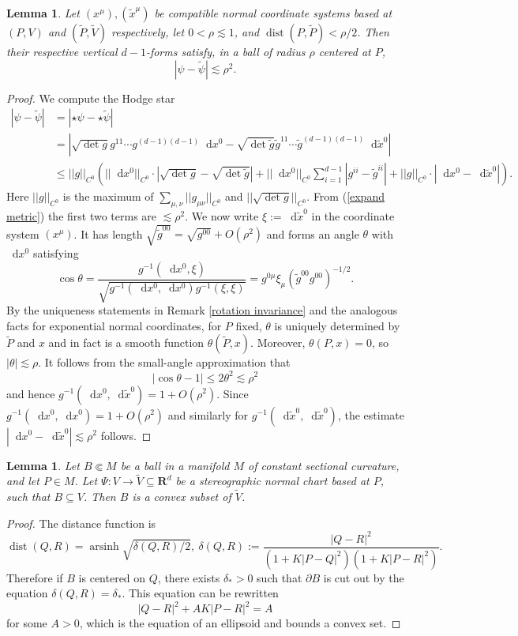 \documentclass[reqno,10pt]{amsart}
\newcommand{\RR}{\mathbf{R}}
\newcommand*\dif{\mathop{}\!\mathrm{d}}
\DeclareMathOperator{\dist}{dist}
\newtheorem{lemma}[theorem]{Lemma}
\theoremstyle{definition}
\numberwithin{equation}{section}
\begin{document}
\begin{lemma}\label{compatible verticals}
Let $(x^\mu), (\tilde x^\mu)$ be compatible normal coordinate systems based at $(P, V)$ and $(\tilde P, \tilde V)$ respectively, let $0 < \rho \lesssim 1$, and $\dist(P, \tilde P) < \rho/2$. Then their respective vertical $d-1$-forms satisfy, in a ball of radius $\rho$ centered at $P$,
$$|\psi - \tilde \psi| \lesssim \rho^2.$$
\end{lemma}
\begin{proof}
We compute the Hodge star 
\begin{align*}
|\psi - \tilde \psi| &= |\star \psi - \star \tilde \psi| \\
&= |\sqrt{\det g} g^{11} \cdots g^{(d-1)(d-1)} \dif x^0 - \sqrt{\det \tilde g} \tilde g^{11} \cdots \tilde g^{(d-1)(d-1)} \dif \tilde x^0| \\
&\leq ||g||_{C^0} (||\dif x^0||_{C^0} \cdot |\sqrt{\det g} - \sqrt{\det \tilde g}| + ||\dif x^0||_{C^0} \sum_{i=1}^{d - 1} |g^{ii} - \tilde g^{ii}| + ||g||_{C^0} \cdot |\dif x^0 - \dif \tilde x^0|).
\end{align*}
Here $||g||_{C^0}$ is the maximum of $\sum_{\mu, \nu} ||g_{\mu\nu}||_{C^0}$ and $||\sqrt{\det g}||_{C^0}$.
From (\ref{expand metric}) the first two terms are $\lesssim \rho^2$.
We now write $\xi := \dif \tilde x^0$ in the coordinate system $(x^\mu)$.
It has length $\sqrt{\tilde g^{00}} = \sqrt{g^{00}} + O(\rho^2)$ and forms an angle $\theta$ with $\dif x^0$ satisfying 
$$\cos \theta = \frac{g^{-1}(\dif x^0, \xi)}{\sqrt{g^{-1}(\dif x^0, \dif x^0) g^{-1}(\xi, \xi)}} = g^{0\mu} \xi_\mu (\tilde g^{00} g^{00})^{-1/2}.$$
By the uniqueness statements in Remark \ref{rotation invariance} and the analogous facts for exponential normal coordinates, for $P$ fixed, $\theta$ is uniquely determined by $\tilde P$ and $x$ and in fact is a smooth function $\theta(\tilde P, x)$.
Moreover, $\theta(P, x) = 0$, so $|\theta| \lesssim \rho$.
It follows from the small-angle approximation that
$$|\cos \theta - 1| \leq 2\theta^2 \lesssim \rho^2$$
and hence $g^{-1}(\dif x^0, \dif \tilde x^0) = 1 + O(\rho^2)$.
Since $g^{-1}(\dif x^0, \dif x^0) = 1 + O(\rho^2)$ and similarly for $g^{-1}(\dif \tilde x^0, \dif \tilde x^0)$, the estimate $|\dif x^0 - \dif \tilde x^0| \lesssim \rho^2$ follows.
\end{proof}

\begin{lemma}\label{convexity of balls}
Let $B \Subset M$ be a ball in a manifold $M$ of constant sectional curvature, and let $P \in M$.
Let $\Psi: V \to \tilde V \subseteq \RR^d$ be a stereographic normal chart based at $P$, such that $B \subseteq V$.
Then $B$ is a convex subset of $\tilde V$.
\end{lemma}
\begin{proof}
The distance function is
$$\dist(Q, R) = \operatorname{arsinh} \sqrt{\delta(Q, R)/2}, ~\delta(Q, R) := \frac{|Q - R|^2}{(1 + K|P - Q|^2)(1 + K|P - R|^2)}.$$
Therefore if $B$ is centered on $Q$, there exists $\delta_* > 0$ such that $\partial B$ is cut out by the equation $\delta(Q, R) = \delta_*$.
This equation can be rewritten
$$|Q - R|^2 + AK|P - R|^2 = A$$
for some $A > 0$, which is the equation of an ellipsoid and bounds a convex set.
\end{proof}
\end{document}
